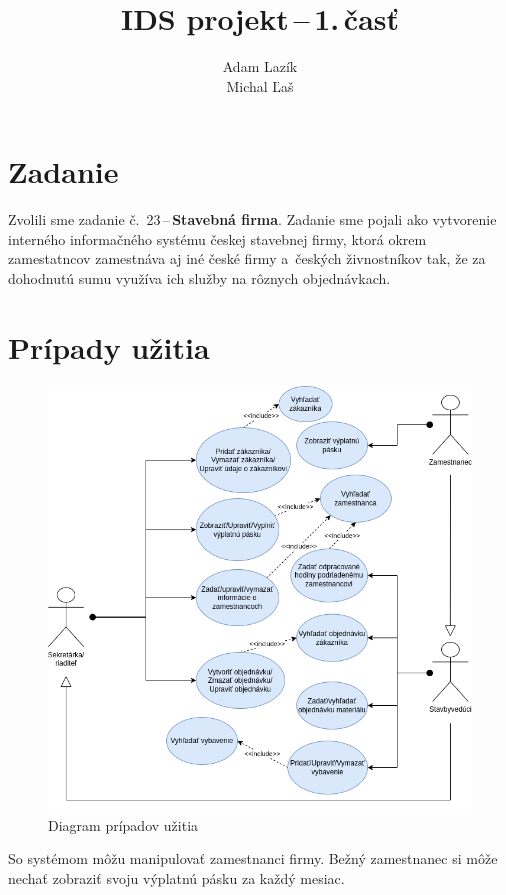 \documentclass[a4paper]{article}
\title{IDS projekt\,--\,1.\,časť}
\author{Adam Lazík\\
Michal Ľaš}
\begin{document}
\maketitle

\section{Zadanie}

Zvolili sme zadanie č.~23\,--\,\textbf{Stavebná firma}.
Zadanie sme pojali ako vytvorenie interného informačného systému českej stavebnej firmy, ktorá okrem zamestatncov zamestnáva aj iné české firmy a~českých živnostníkov tak, že za dohodnutú sumu využíva ich služby na rôznych objednávkach.

\section{Prípady užitia}

\begin{figure}[H]
    \centering
    \includegraphics[width=\linewidth,height=0.55\textheight,keepaspectratio]{StavebnaFirmaUseCase.png}
    \caption{Diagram prípadov užitia}
\end{figure}

So systémom môžu manipulovať zamestnanci firmy.
Bežný zamestnanec si môže nechať zobraziť svoju výplatnú pásku za každý mesiac.
\end{document}
